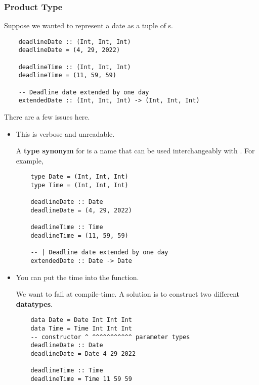 \documentclass[letterpaper]{article}
\begin{document}
\subsubsection{Product Type}
Suppose we wanted to represent a date as a tuple of s. 
\begin{verbatim}
    deadlineDate :: (Int, Int, Int)
    deadlineDate = (4, 29, 2022)

    deadlineTime :: (Int, Int, Int)
    deadlineTime = (11, 59, 59)

    -- Deadline date extended by one day
    extendedDate :: (Int, Int, Int) -> (Int, Int, Int)\end{verbatim}
There are a few issues here.
\begin{itemize}
    \item This is verbose and unreadable.
    \begin{mdframed}[]
        A \textbf{type synonym} for  is a name that can be used interchangeably with . For example, 
        \begin{verbatim}
    type Date = (Int, Int, Int)
    type Time = (Int, Int, Int)
    
    deadlineDate :: Date
    deadlineDate = (4, 29, 2022)
    
    deadlineTime :: Time
    deadlineTime = (11, 59, 59)
    
    -- | Deadline date extended by one day
    extendedDate :: Date -> Date
        \end{verbatim}
    \end{mdframed}
    \item You can put the time into the  function.
    \begin{mdframed}[]
        We want  to fail at compile-time. A solution is to construct two different \textbf{datatypes}.
        \begin{verbatim}
    data Date = Date Int Int Int
    data Time = Time Int Int Int 
    -- constructor ^ ^^^^^^^^^^^ parameter types
    deadlineDate :: Date 
    deadlineDate = Date 4 29 2022 

    deadlineTime :: Time 
    deadlineTime = Time 11 59 59
        \end{verbatim}
        
    \end{mdframed}
\end{itemize}
\end{document}
